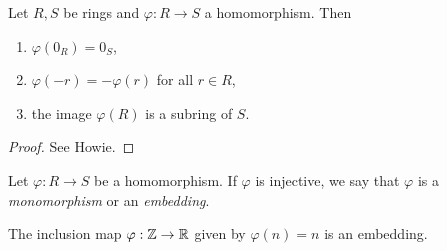 \begin{theorem}
  Let $R, S$ be rings and $\varphi : R \to S$ a
  homomorphism. Then
  \begin{enumerate}
    \item $\varphi(0_R) = 0_S$,
    \item $\varphi(-r) = -\varphi(r)$ for all $r \in R$,
    \item the image $\varphi(R)$ is a subring of $S$.
  \end{enumerate}
\end{theorem}

\begin{proof}
  See Howie.
\end{proof}

\begin{definition}[Monomorphism]
  Let $\varphi : R \to S$ be a homomorphism. If
  $\varphi$ is injective, we say that $\varphi$ is
  a \emph{monomorphism} or an \emph{embedding}.
\end{definition}

\begin{example}
  The inclusion map $\varphi : \mathbb{Z} \to \mathbb{R}$ given by
  $\varphi(n) = n$ is an embedding.
\end{example}
